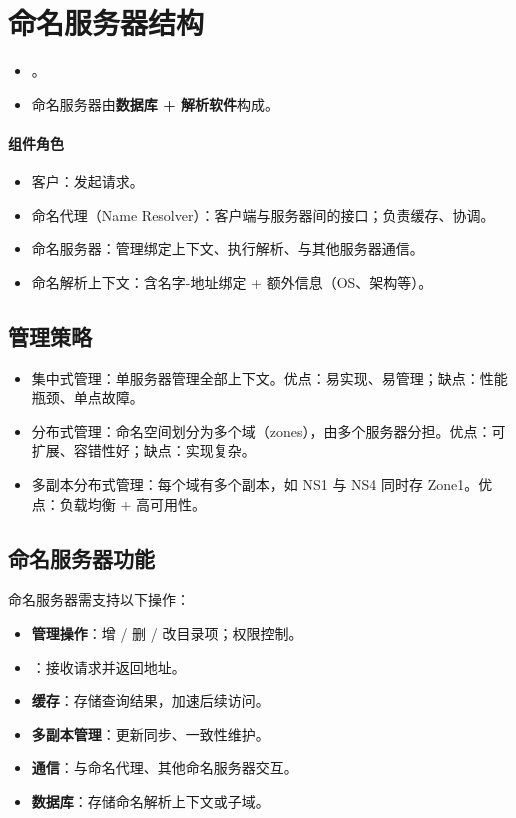 \section{命名服务器结构}

\begin{itemize}
  \item {}。
  \item 命名服务器由\textbf{数据库 + 解析软件}构成。
\end{itemize}

\paragraph{组件角色}
\begin{itemize}
  \item 客户：发起请求。
  \item 命名代理（Name Resolver）：客户端与服务器间的接口；负责缓存、协调。
  \item 命名服务器：管理绑定上下文、执行解析、与其他服务器通信。
  \item 命名解析上下文：含名字-地址绑定 + 额外信息（OS、架构等）。
\end{itemize}

\subsection{管理策略}

\begin{itemize}
  \item 集中式管理：单服务器管理全部上下文。优点：易实现、易管理；缺点：性能瓶颈、单点故障。
  \item 分布式管理：命名空间划分为多个域（zones），由多个服务器分担。优点：可扩展、容错性好；缺点：实现复杂。
  \item 多副本分布式管理：每个域有多个副本，如 NS1 与 NS4 同时存 Zone1。优点：负载均衡 + 高可用性。
\end{itemize}

\subsection{命名服务器功能}

命名服务器需支持以下操作：
\begin{itemize}
  \item \textbf{管理操作}：增 / 删 / 改目录项；权限控制。
  \item {}：接收请求并返回地址。
  \item \textbf{缓存}：存储查询结果，加速后续访问。
  \item \textbf{多副本管理}：更新同步、一致性维护。
  \item \textbf{通信}：与命名代理、其他命名服务器交互。
  \item \textbf{数据库}：存储命名解析上下文或子域。
\end{itemize}

